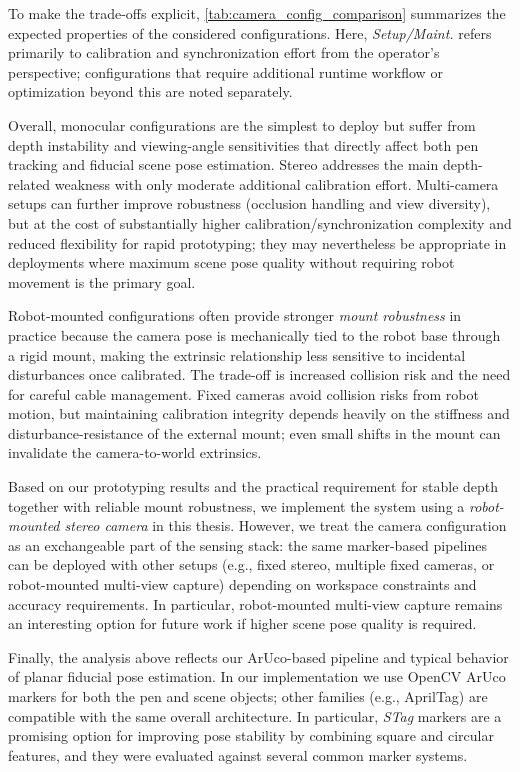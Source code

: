 To make the trade-offs explicit, \autoref{tab:camera_config_comparison} summarizes the expected properties of the considered configurations. Here, \emph{Setup/Maint.} refers primarily to calibration and synchronization effort from the operator's perspective; configurations that require additional runtime workflow or optimization beyond this are noted separately.

Overall, monocular configurations are the simplest to deploy but suffer from depth instability and viewing-angle sensitivities that directly affect both pen tracking and fiducial scene pose estimation. Stereo addresses the main depth-related weakness with only moderate additional calibration effort. Multi-camera setups can further improve robustness (occlusion handling and view diversity), but at the cost of substantially higher calibration/synchronization complexity and reduced flexibility for rapid prototyping; they may nevertheless be appropriate in deployments where maximum scene pose quality without requiring robot movement is the primary goal.

Robot-mounted configurations often provide stronger \emph{mount robustness} in practice because the camera pose is mechanically tied to the robot base through a rigid mount, making the extrinsic relationship less sensitive to incidental disturbances once calibrated. The trade-off is increased collision risk and the need for careful cable management. Fixed cameras avoid collision risks from robot motion, but maintaining calibration integrity depends heavily on the stiffness and disturbance-resistance of the external mount; even small shifts in the mount can invalidate the camera-to-world extrinsics.

Based on our prototyping results and the practical requirement for stable depth together with reliable mount robustness, we implement the system using a \emph{robot-mounted stereo camera} in this thesis. However, we treat the camera configuration as an exchangeable part of the sensing stack: the same marker-based pipelines can be deployed with other setups (e.g., fixed stereo, multiple fixed cameras, or robot-mounted multi-view capture) depending on workspace constraints and accuracy requirements. In particular, robot-mounted multi-view capture remains an interesting option for future work if higher scene pose quality is required.

Finally, the analysis above reflects our ArUco-based pipeline and typical behavior of planar fiducial pose estimation. In our implementation we use OpenCV ArUco markers for both the pen and scene objects; other families (e.g., AprilTag) are compatible with the same overall architecture. In particular, \emph{STag} markers \cite{BENLIGIRAY2019158} are a promising option for improving pose stability by combining square and circular features, and they were evaluated against several common marker systems.


